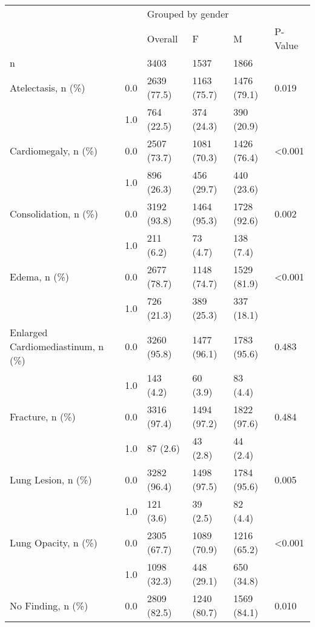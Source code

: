 \begin{tabular}{llllll}
\toprule
                       &     & \multicolumn{4}{l}{Grouped by gender} \\
                       &     &           Overall &            F &            M & P-Value \\
\midrule
n & {} &              3403 &         1537 &         1866 &         \\
Atelectasis, n (\%) & 0.0 &       2639 (77.5) &  1163 (75.7) &  1476 (79.1) &   0.019 \\
                       & 1.0 &        764 (22.5) &   374 (24.3) &   390 (20.9) &         \\
Cardiomegaly, n (\%) & 0.0 &       2507 (73.7) &  1081 (70.3) &  1426 (76.4) &  <0.001 \\
                       & 1.0 &        896 (26.3) &   456 (29.7) &   440 (23.6) &         \\
Consolidation, n (\%) & 0.0 &       3192 (93.8) &  1464 (95.3) &  1728 (92.6) &   0.002 \\
                       & 1.0 &         211 (6.2) &     73 (4.7) &    138 (7.4) &         \\
Edema, n (\%) & 0.0 &       2677 (78.7) &  1148 (74.7) &  1529 (81.9) &  <0.001 \\
                       & 1.0 &        726 (21.3) &   389 (25.3) &   337 (18.1) &         \\
Enlarged Cardiomediastinum, n (\%) & 0.0 &       3260 (95.8) &  1477 (96.1) &  1783 (95.6) &   0.483 \\
                       & 1.0 &         143 (4.2) &     60 (3.9) &     83 (4.4) &         \\
Fracture, n (\%) & 0.0 &       3316 (97.4) &  1494 (97.2) &  1822 (97.6) &   0.484 \\
                       & 1.0 &          87 (2.6) &     43 (2.8) &     44 (2.4) &         \\
Lung Lesion, n (\%) & 0.0 &       3282 (96.4) &  1498 (97.5) &  1784 (95.6) &   0.005 \\
                       & 1.0 &         121 (3.6) &     39 (2.5) &     82 (4.4) &         \\
Lung Opacity, n (\%) & 0.0 &       2305 (67.7) &  1089 (70.9) &  1216 (65.2) &  <0.001 \\
                       & 1.0 &       1098 (32.3) &   448 (29.1) &   650 (34.8) &         \\
No Finding, n (\%) & 0.0 &       2809 (82.5) &  1240 (80.7) &  1569 (84.1) &   0.010 \\

\end{tabular}
